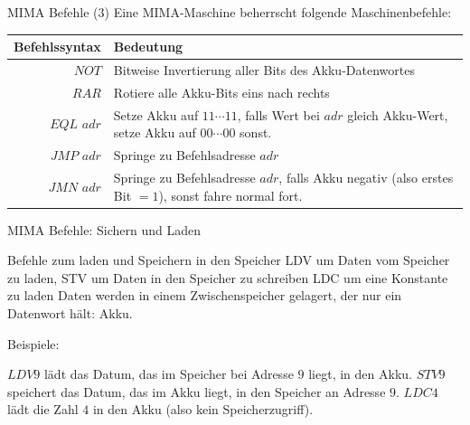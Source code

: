 \begin{frame}{MIMA Befehle (3)}
	Eine MIMA-Maschine beherrscht folgende Maschinenbefehle:
	
	\vspace{.5cm}
	
	\begin{tabular}{r | p{8cm} }
		Befehlssyntax & Bedeutung\\\hline\hline \ip
		$NOT$ & Bitweise Invertierung aller Bits des Akku-Datenwortes\\\hline\ip
		$RAR$ & Rotiere alle Akku-Bits eins nach rechts\\\hline\ip
		$EQL$ $adr$ & Setze Akku auf $11\cdots11$, falls Wert bei $adr$ gleich Akku-Wert, setze Akku auf $00\cdots00$ sonst.\\\hline\ip
		$JMP$ $adr$ & Springe zu Befehlsadresse $adr$\\\hline\ip
		$JMN$ $adr$ & Springe zu Befehlsadresse $adr$, falls Akku negativ (also erstes Bit $=1$), sonst fahre normal fort.
	\end{tabular}
\end{frame}


\begin{frame}{MIMA Befehle: Sichern und Laden}
	\begin{itemize}
		\pitem Befehle zum laden und Speichern in den Speicher
		\pitem LDV um Daten vom Speicher zu laden, STV um Daten in den Speicher zu schreiben
		\pitem LDC um eine Konstante zu laden
		\pitem Daten werden in einem Zwischenspeicher gelagert, der nur ein Datenwort hält\ip : Akku.
	\end{itemize}

	\bp

	Beispiele:
	
	\begin{itemize}
		\pitem $LDV 9$ lädt das Datum, das im Speicher bei Adresse $9$ liegt, in den Akku.
		\pitem $STV 9$ speichert das Datum, das im Akku liegt, in den Speicher an Adresse $9$.
		\pitem $LDC 4$ lädt die Zahl $4$ in den Akku (also kein Speicherzugriff).
	\end{itemize}
\end{frame}

